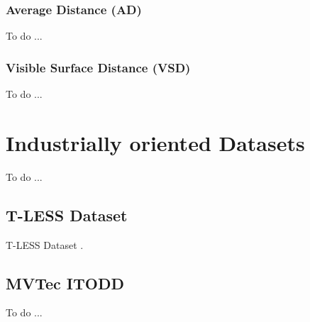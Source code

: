 \subsubsection{Average Distance (AD)}\label{subsubsec:average_distance}
To do ...

\subsubsection{Visible Surface Distance (VSD)}\label{subsubsec:average_distance}
To do ...

\section{Industrially oriented Datasets}\label{sec:datasets}
To do ...

\subsection{T-LESS Dataset}\label{subsec:tless_dataset}
T-LESS Dataset \cite{hodan2017tless}.

\subsection{MVTec ITODD}\label{subsec:mvtex_itodd}
To do ...